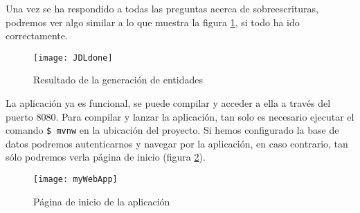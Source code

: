 Una vez se ha respondido a todas las preguntas acerca de sobreescrituras, podremos ver algo similar a lo que muestra la figura \ref{fig:JDLdone}, si todo ha ido correctamente.

\begin{figure}[!h]
\begin{center}
\texttt{[image: JDLdone]}
\caption{Resultado de la generación de entidades}
\label{fig:JDLdone}
\end{center}
\end{figure}

La aplicación ya es funcional, se puede compilar y acceder a ella a través del puerto 8080. Para compilar y lanzar la aplicación, tan solo es necesario ejecutar el comando \texttt{\$ mvnw} en la ubicación del proyecto. Si hemos configurado la base de datos podremos autenticarnos y navegar por la aplicación, en caso contrario, tan sólo podremos verla página de inicio (figura \ref{fig:myWebApp}).

\begin{figure}[!h]
\begin{center}
\texttt{[image: myWebApp]}
\caption{Página de inicio de la aplicación}
\label{fig:myWebApp}
\end{center}
\end{figure}
